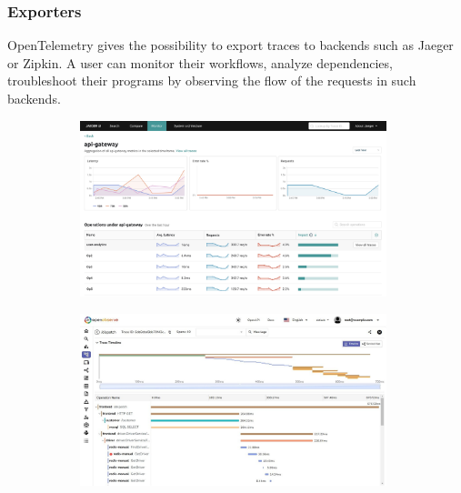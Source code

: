     \subsubsection{Exporters}
            OpenTelemetry gives the possibility to export traces to backends such as Jaeger or Zipkin. A user can monitor their workflows, analyze dependencies, troubleshoot their programs by observing the flow of the requests in such backends. \cite{jg}
       \begin{figure}[H]
            \centering
            \begin{subfigure}{.5\textwidth}
                \centering
                \includegraphics[width=0.98\textwidth]{img/jaeger.png}
                \label{fig:sub1}
            \end{subfigure}%
            \begin{subfigure}{.5\textwidth}
                \centering
                \includegraphics[width =0.98\textwidth]{img/jaeger2.jpg}
                \label{fig:sub2}
            \end{subfigure}
            \label{fig:test}
            \end{figure}


